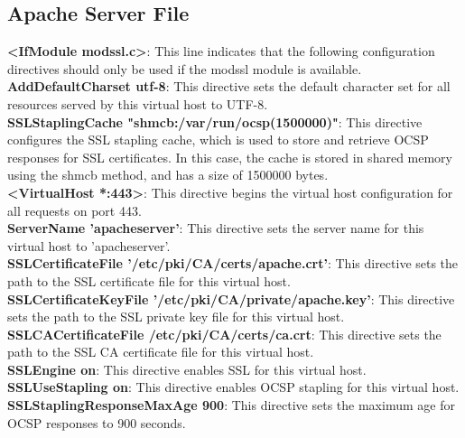 \documentclass[12pt]{article}
\begin{document}
\newpage

\subsection{Apache Server File}
\textbf{<IfModule mod\textunderscore ssl.c>}: This line indicates that the following configuration directives should only be used if the mod\textunderscore ssl module is available.\\

\textbf{AddDefaultCharset utf-8}: This directive sets the default character set for all resources served by this virtual host to UTF-8.\\

\textbf{SSLStaplingCache "shmcb:/var/run/ocsp(1500000)"}: This directive configures the SSL stapling cache, which is used to store and retrieve OCSP responses for SSL certificates. In this case, the cache is stored in shared memory using the shmcb method, and has a size of 1500000 bytes.\\

\textbf{<VirtualHost *:443>}: This directive begins the virtual host configuration for all requests on port 443.\\

\textbf{ServerName 'apacheserver'}: This directive sets the server name for this virtual host to 'apacheserver'.\\

\textbf{SSLCertificateFile '/etc/pki/CA/certs/apache.crt'}: This directive sets the path to the SSL certificate file for this virtual host.\\

\textbf{SSLCertificateKeyFile '/etc/pki/CA/private/apache.key'}: This directive sets the path to the SSL private key file for this virtual host.\\

\textbf{SSLCACertificateFile /etc/pki/CA/certs/ca.crt}: This directive sets the path to the SSL CA certificate file for this virtual host.\\

\textbf{SSLEngine on}: This directive enables SSL for this virtual host.\\

\textbf{SSLUseStapling on}: This directive enables OCSP stapling for this virtual host.\\

\textbf{SSLStaplingResponseMaxAge 900}: This directive sets the maximum age for OCSP responses to 900 seconds.\\
\end{document}
